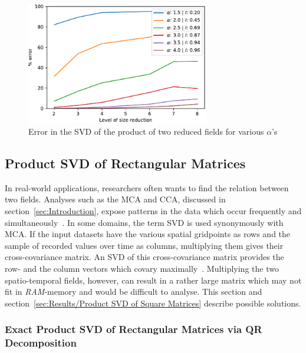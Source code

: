 \documentclass[ijgi,article,submit,moreauthors,pdftex,10pt,a4paper]{Definitions/mdpi}
\begin{document}
\begin{figure}[H]
\centering
\includegraphics[width=80mm]{Results/plotRandomisedSizeReducedMatrixProduct.pdf}
\caption[Error after reduction]{Error in the SVD of the product of two reduced fields for various $\alpha$'s}
\label{fig:plotRandomisedSizeReducedMatrixProduct}
\end{figure}

\subsection{Product SVD of Rectangular Matrices}
\label{sec:Results/Product SVD of Rectangular Matrices}

In real-world applications, researchers often wants to find the relation between two fields. Analyses such as the MCA and CCA, discussed in section~\ref{sec:Introduction}, expose patterns in the data which occur frequently and simultaneously~\cite{Eshel2011, Storch1999}. In some domains, the term SVD is used synonymously with MCA. If the input datasets have the various spatial gridpoints as rows and the sample of recorded values over time as columns, multiplying them gives their cross-covariance matrix. An SVD of this cross-covariance matrix provides the row- and the column vectors which covary maximally~\cite{Bretherton1992}. Multiplying the two spatio-temporal fields, however, can result in a rather large matrix which may not fit in \textit{RAM}-memory and would be difficult to analyse. This section and section~\ref{sec:Results/Product SVD of Square Matrices} describe possible solutions.

\subsubsection{Exact Product SVD of Rectangular Matrices via QR Decomposition} %
\end{document}
